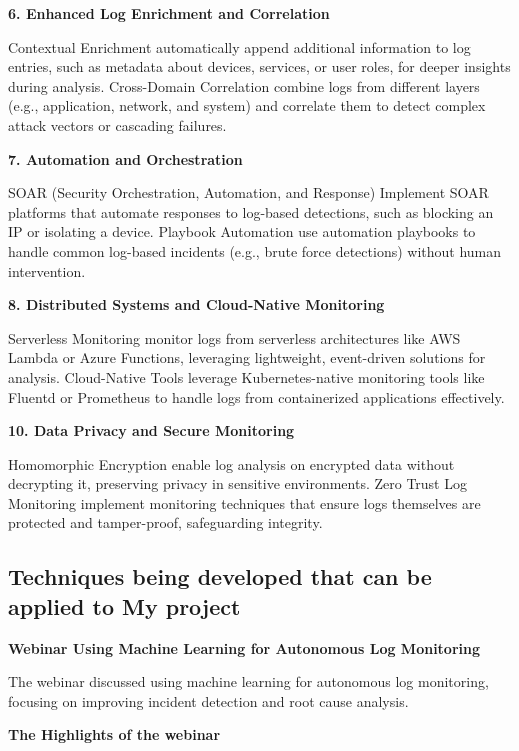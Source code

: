 \textbf{6. Enhanced Log Enrichment and Correlation}

Contextual Enrichment automatically append additional information to log entries, such as metadata about devices, services, or user roles, for deeper insights during analysis.
Cross-Domain Correlation combine logs from different layers (e.g., application, network, and system) and correlate them to detect complex attack vectors or cascading failures.

\textbf{7. Automation and Orchestration}

SOAR (Security Orchestration, Automation, and Response) Implement SOAR platforms that automate responses to log-based detections, such as blocking an IP or isolating a device.
Playbook Automation use automation playbooks to handle common log-based incidents (e.g., brute force detections) without human intervention.



\textbf{8. Distributed Systems and Cloud-Native Monitoring}

Serverless Monitoring monitor logs from serverless architectures like AWS Lambda or Azure Functions, leveraging lightweight, event-driven solutions for analysis.
Cloud-Native Tools leverage Kubernetes-native monitoring tools like Fluentd or Prometheus to handle logs from containerized applications effectively.

\textbf{10. Data Privacy and Secure Monitoring}

Homomorphic Encryption enable log analysis on encrypted data without decrypting it, preserving privacy in sensitive environments.
Zero Trust Log Monitoring implement monitoring techniques that ensure logs themselves are protected and tamper-proof, safeguarding integrity.



\subsection{Techniques being developed that can be applied to My project}



\textbf{Webinar Using Machine Learning for Autonomous Log Monitoring}

The webinar discussed using machine learning for autonomous log monitoring, focusing on improving incident detection and root cause analysis.

 
\textbf{The Highlights of the webinar}

